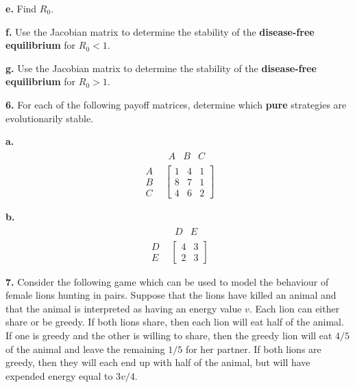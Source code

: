\documentclass[reqno,12pt]{amsart}
\begin{document}
\noindent
{\bf e.}  Find $R_0$.

\noindent
{\bf f.}  Use the Jacobian matrix to determine the stability of
the {\bf disease-free equilibrium} for $R_0 < 1$.

\noindent
{\bf g.}  Use the Jacobian matrix to determine the stability of
the {\bf disease-free equilibrium} for $R_0 > 1$.


\vspace{3cm}

\noindent
{\bf 6.}  For each of the following payoff matrices, determine which
{\bf pure} strategies are evolutionarily stable.

\noindent
{\bf a.}
$$
\begin{matrix}
  & \begin{matrix} A & B & C \end{matrix} 	\\
\begin{matrix} A \\ B \\ C \end{matrix}		&
\begin{bmatrix}
1 & 4 & 1	\\
8 & 7 & 1 	\\
4 & 6 & 2
\end{bmatrix}
\end{matrix}
$$

\noindent
{\bf b.}
$$
\begin{matrix}
  & \begin{matrix} D & E \end{matrix} 	\\
\begin{matrix} D \\ E \end{matrix}		&
\begin{bmatrix}
4 & 3 	\\
2 & 3
\end{bmatrix}
\end{matrix}
$$



\newpage
\vspace{1cm}

\noindent
{\bf 7.}  Consider the following game which can be used to model
the behaviour of female lions hunting in pairs.  Suppose that the
lions have killed an animal and that the animal is interpreted
as having an energy value $v$.  Each lion can either share or be
greedy.  If both lions share, then each lion will eat half of the
animal.  If one is greedy and the other is willing to share, then
the greedy lion will eat $4/5$ of the animal and leave the
remaining $1/5$ for her partner.  If both lions are greedy,
then they will each end up with half of the animal, but will
have expended energy equal to $3v/4$.
\end{document}
